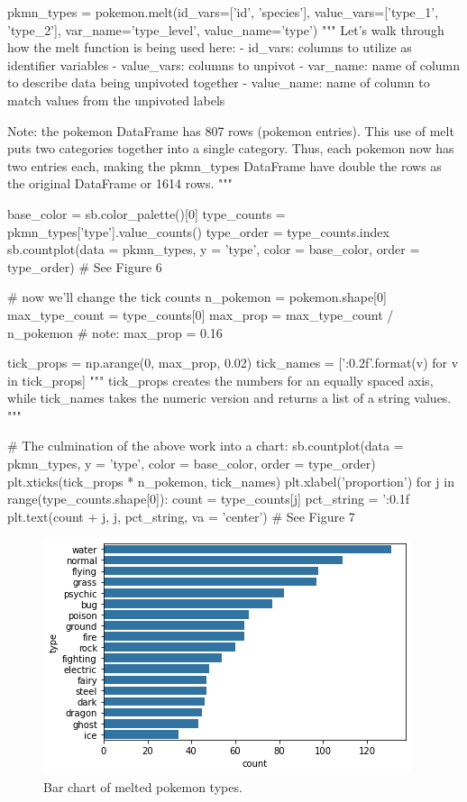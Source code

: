 \begin{python}
	pkmn_types = pokemon.melt(id_vars=['id', 'species'], 
				 value_vars=['type_1', 'type_2'], 
				 var_name='type_level', 
				 value_name='type')
	"""
	Let's walk through how the melt function is being used here:
	- id_vars: columns to utilize as identifier variables
	- value_vars: columns to unpivot
	- var_name: name of column to describe data being unpivoted together
	- value_name: name of column to match values from the unpivoted labels
	
	Note: the pokemon DataFrame has 807 rows (pokemon entries). This use of melt puts two categories together into a single category. Thus, each pokemon now has two entries each, making the pkmn_types DataFrame have double the rows as the original DataFrame or 1614 rows.
	"""
	
	base_color = sb.color_palette()[0]
	type_counts = pkmn_types['type'].value_counts()
	type_order = type_counts.index
	sb.countplot(data = pkmn_types, y = 'type', color = base_color, order = type_order)
	# See Figure 6
	
	# now we'll change the tick counts
	n_pokemon = pokemon.shape[0]
	max_type_count = type_counts[0]
	max_prop = max_type_count / n_pokemon
	# note: max_prop = 0.16
	
	tick_props = np.arange(0, max_prop, 0.02)
	tick_names = ['{:0.2f}'.format(v) for v in tick_props]
	"""
	tick_props creates the numbers for an equally spaced axis, while tick_names takes the numeric version and returns a list of a string values.
	"""
	
	# The culmination of the above work into a chart:
	sb.countplot(data = pkmn_types, y = 'type', color = base_color, order = type_order)
	plt.xticks(tick_props * n_pokemon, tick_names)
	plt.xlabel('proportion')
	for j in range(type_counts.shape[0]):
	count = type_counts[j]
	pct_string = '{:0.1f}%
	plt.text(count + j, j, pct_string, va = 'center')
	# See Figure 7
\end{python}

\begin{figure}
	\includegraphics{images/figure6.png}
	\caption{Bar chart of melted pokemon types.}\label{fig:figure6}
\end{figure}

